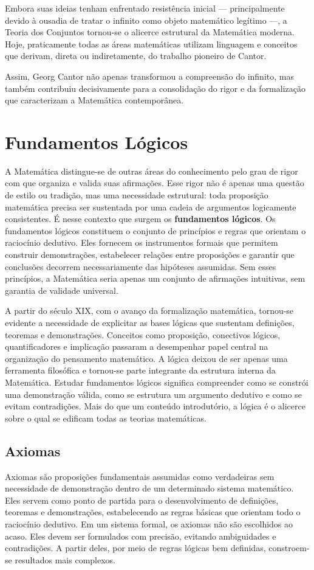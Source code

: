 \documentclass[12pt,a4paper,openright]{book}
\begin{document}
Embora suas ideias tenham enfrentado resistência inicial — principalmente devido à ousadia de tratar o infinito como objeto matemático legítimo —, a Teoria dos Conjuntos tornou-se o alicerce estrutural da Matemática moderna. Hoje, praticamente todas as áreas matemáticas utilizam linguagem e conceitos que derivam, direta ou indiretamente, do trabalho pioneiro de Cantor.

Assim, Georg Cantor não apenas transformou a compreensão do infinito, mas também contribuiu decisivamente para a consolidação do rigor e da formalização que caracterizam a Matemática contemporânea.

\chapter{Fundamentos Lógicos}

A Matemática distingue-se de outras áreas do conhecimento pelo grau de rigor com que organiza e valida suas afirmações. Esse rigor não é apenas uma questão de estilo ou tradição, mas uma necessidade estrutural: toda proposição matemática precisa ser sustentada por uma cadeia de argumentos logicamente consistentes. É nesse contexto que surgem os \textbf{fundamentos lógicos}. Os fundamentos lógicos constituem o conjunto de princípios e regras que orientam o raciocínio dedutivo. Eles fornecem os instrumentos formais que permitem construir demonstrações, estabelecer relações entre proposições e garantir que conclusões decorrem necessariamente das hipóteses assumidas. Sem esses princípios, a Matemática seria apenas um conjunto de afirmações intuitivas, sem garantia de validade universal.

A partir do século XIX, com o avanço da formalização matemática, tornou-se evidente a necessidade de explicitar as bases lógicas que sustentam definições, teoremas e demonstrações. Conceitos como proposição, conectivos lógicos, quantificadores e implicação passaram a desempenhar papel central na organização do pensamento matemático. A lógica deixou de ser apenas uma ferramenta filosófica e tornou-se parte integrante da estrutura interna da Matemática. Estudar fundamentos lógicos significa compreender como se constrói uma demonstração válida, como se estrutura um argumento dedutivo e como se evitam contradições. Mais do que um conteúdo introdutório, a lógica é o alicerce sobre o qual se edificam todas as teorias matemáticas.
\section{Axiomas}
Axiomas são proposições fundamentais assumidas como verdadeiras sem necessidade de demonstração dentro de um determinado sistema matemático. Eles servem como ponto de partida para o desenvolvimento de definições, teoremas e demonstrações, estabelecendo as regras básicas que orientam todo o raciocínio dedutivo. Em um sistema formal, os axiomas não são escolhidos ao acaso. Eles devem ser formulados com precisão, evitando ambiguidades e contradições. A partir deles, por meio de regras lógicas bem definidas, constroem-se resultados mais complexos.
\end{document}
